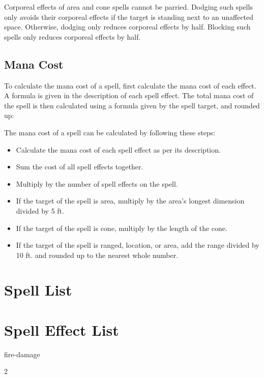 \begin{multicols*}{2}
    Corporeal effects of area and cone spells cannot be parried. Dodging such
    spells only avoids their corporeal effects if the target is standing next
    to an unaffected space. Otherwise, dodging only reduces corporeal effects
    by half. Blocking such spells only reduces corporeal effects by half.

    \subsection{Mana Cost}
    To calculate the mana cost of a spell, first calculate the mana cost of
    each effect. A formula is given in the description of each spell effect.
    The total mana cost of the spell is then calculated using a formula given
    by the spell target, and rounded up:

    The mana cost of a spell can be calculated by following these steps:
    \begin{itemize}
        \item Calculate the mana cost of each spell effect as per its
            description.
        \item Sum the cost of all spell effects together.
        \item Multiply by the number of spell effects on the spell.
        \item If the target of the spell is area, multiply by the area's
            longest dimension divided by 5 ft.
        \item If the target of the spell is cone, multiply by the length of
            the cone.
        \item If the target of the spell is ranged, location, or area,
            add the range divided by 10 ft. and rounded up to the nearest
            whole number.
    \end{itemize}
    
    \section{Spell List}

    \section{Spell Effect List}
    {fire-damage}

\end{multicols*}{2}
